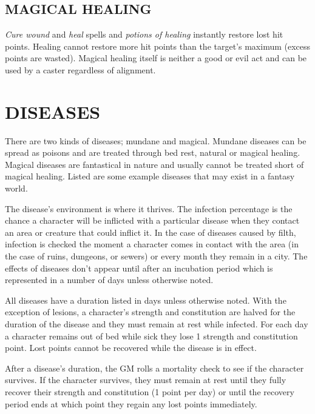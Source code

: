 \begin{multicols}{2}

\subsection{MAGICAL HEALING}

\textit{Cure wound} and \textit{heal} spells and \textit{potions of healing} instantly restore lost hit points.  Healing cannot restore more hit points than the target's maximum (excess points are wasted).  Magical healing itself is neither a good or evil act and can be used by a caster regardless of alignment.

\section{DISEASES}

There are two kinds of diseases; mundane and magical.  Mundane diseases can be spread as poisons and are treated through bed rest, natural or magical healing.  Magical diseases are fantastical in nature and usually cannot be treated short of magical healing.  Listed are some example diseases that may exist in a fantasy world.

The disease's environment is where it thrives.  The infection percentage is the chance a character will be inflicted with a particular disease when they contact an area or creature that could inflict it.  In the case of diseases caused by filth, infection is checked the moment a character comes in contact with the area (in the case of ruins, dungeons, or sewers) or every month they remain in a city.  The effects of diseases don't appear until after an incubation period which is represented in a number of days unless otherwise noted.  

All diseases have a duration listed in days unless otherwise noted.  With the exception of lesions, a character's strength and constitution are halved for the duration of the disease and they must remain at rest while infected.  For each day a character remains out of bed while sick they lose 1 strength and constitution point.  Lost points cannot be recovered while the disease is in effect.

After a disease's duration, the GM rolls a mortality check to see if the character survives.  If the character survives, they must remain at rest until they fully recover their strength and constitution (1 point per day) or until the recovery period ends at which point they regain any lost points immediately.


\end{multicols}
